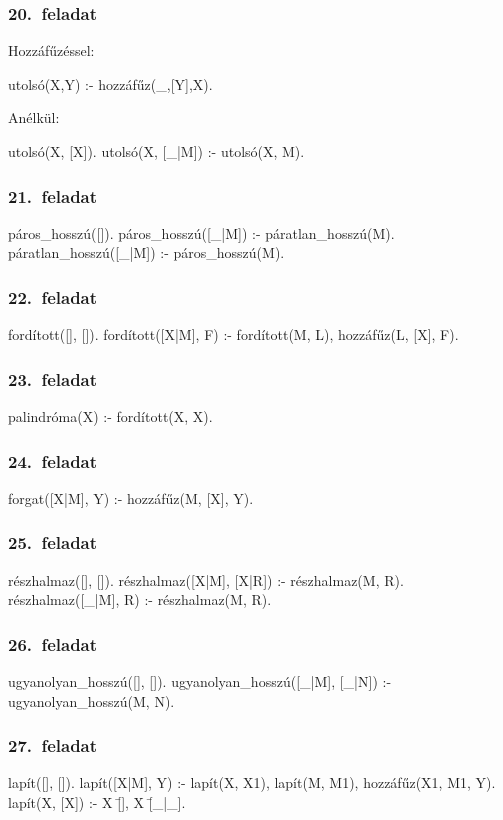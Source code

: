 \subsubsection*{20.~feladat}
Hozzáfűzéssel:
\begin{program}
utolsó(X,Y) :- hozzáfűz(_,[Y],X).
\end{program}
Anélkül:
\begin{program}
utolsó(X, [X]). 
utolsó(X, [_|M]) :- utolsó(X, M). 
\end{program}
\subsubsection*{21.~feladat}
\begin{program}
páros_hosszú([]). 
páros_hosszú([_|M]) :- páratlan_hosszú(M). 
páratlan_hosszú([_|M]) :- páros_hosszú(M). 
\end{program}
\subsubsection*{22.~feladat}
\begin{program}
fordított([], []). 
fordított([X|M], F) :-
    fordított(M, L), hozzáfűz(L, [X], F).
\end{program}
\subsubsection*{23.~feladat}
\begin{program}
palindróma(X) :- fordított(X, X).
\end{program}
\subsubsection*{24.~feladat}
\begin{program}
forgat([X|M], Y) :- hozzáfűz(M, [X], Y). 
\end{program}
\subsubsection*{25.~feladat}
\begin{program}
részhalmaz([], []).
részhalmaz([X|M], [X|R]) :- részhalmaz(M, R).
részhalmaz([_|M], R) :- részhalmaz(M, R).
\end{program}
\subsubsection*{26.~feladat}
\begin{program}
ugyanolyan_hosszú([], []). 
ugyanolyan_hosszú([_|M], [_|N]) :-
    ugyanolyan_hosszú(M, N). 
\end{program}
\subsubsection*{27.~feladat}
\begin{program}
lapít([], []). 
lapít([X|M], Y) :-
    lapít(X, X1), lapít(M, M1),
    hozzáfűz(X1, M1, Y). 
lapít(X, [X]) :- X \= [], X \= [_|_]. 
\end{program}
